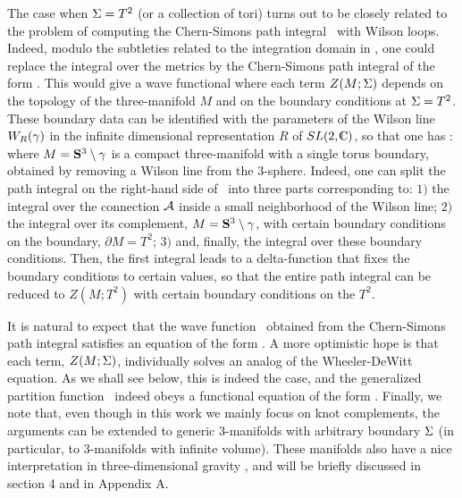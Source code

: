 The case when ${\Sigma}=T^2$ (or a collection of tori)
turns out to be closely related to the problem of computing
the Chern-Simons path integral \zwpathint\ with Wilson loops.
Indeed, modulo the subtleties related to the integration
domain in \hhpsi, one could replace the integral over
the metrics by the Chern-Simons path integral of the form \zpathint.
This would give a wave functional
%
\eqn{}
%
where each term $Z(M;{\Sigma})$ depends on the topology of
the three-manifold $M$ and on the boundary conditions at ${\Sigma}=T^2$.
These boundary data can be identified
with the parameters of the Wilson line $W_R (\gamma)$
in the infinite dimensional representation $R$ of $SL(2,\IC)$,
so that one has \Rozansky:
%
\eqn{}
%
where $M = {\bf S}^3 \setminus \gamma$
is a compact three-manifold with a single torus boundary,
obtained by removing a Wilson line from the 3-sphere.
Indeed, one can split the path integral on the right-hand
side of \zmtvszk\ into three parts corresponding to:
$1)$ the integral over the connection ${\cal A}$ inside a small
neighborhood of the Wilson line;
$2)$ the integral over its
complement, $M={\bf S}^3 \setminus \gamma$, with certain
boundary conditions on the boundary, $\partial M = T^2$;
$3)$ and, finally, the integral over these boundary conditions.
Then, the first integral leads to a delta-function that
fixes the boundary conditions to certain values, so that
the entire path integral can be reduced to $Z(M;T^2)$ with
certain boundary conditions on the $T^2$.

\ifig{}
{}

It is natural to expect that the wave function \hhpsiz\
obtained from the Chern-Simons path integral
satisfies an equation of the form \wdweq.
A more optimistic hope is that each term, $Z(M;{\Sigma})$,
individually solves an analog of the Wheeler-DeWitt equation.
As we shall see below, this is indeed the case,
and the generalized partition function \zwpathint\
indeed obeys a functional equation of the form \wdweq.
Finally, we note that, even though in this work we mainly
focus on knot complements, the arguments can be extended
to generic 3-manifolds with arbitrary boundary ${\Sigma}$
(in particular, to 3-manifolds with infinite volume).
These manifolds also have a nice interpretation in
three-dimensional gravity \KirillRiemann, and will be
briefly discussed in section 4 and in Appendix A.


